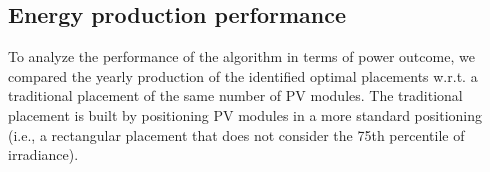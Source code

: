 \subsection{Energy production performance}
To analyze the performance of the algorithm in terms of power outcome, we compared the yearly production of the identified optimal placements w.r.t. a traditional placement of the same number of PV modules. The traditional placement is built by positioning PV modules in a more standard positioning (i.e., a  rectangular placement that does not consider the 75th percentile of irradiance).

